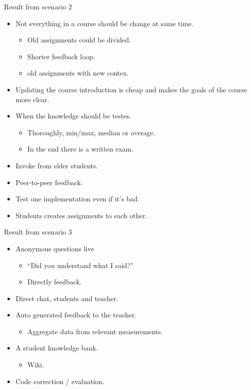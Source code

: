 \documentclass[a4paper,12pt]{article}
\begin{document}
Result from scenario 2
\begin{itemize}
\item Not everything in a course should be change at same time.
\begin{itemize}
\item Old assignments could be divided.
\item Shorter feedback loop.
\item old assignments with new contex.
\end{itemize}
\item Updating the course introduction is cheap and makes the goals of the course more clear.
\item When the knowledge should be testes.
\begin{itemize}
\item Thoroughly, min/max, median or average.
\item In the end there is a written exam.
\end{itemize}
\item Invoke from elder students.
\item Peer-to-peer feedback.
\item Test one implementation even if it's bad.
\item Students creates assignments to each other.
\end{itemize}

Result from scenario 3
\begin{itemize}
\item Anonymous questions live
\begin{itemize}
\item ``Did you understand what I said?''
\item Directly feedback.
\end{itemize}
\item Direct chat, students and teacher.
\item Auto generated feedback to the teacher.
\begin{itemize}
\item Aggregate data from relevant measurements.
\end{itemize}
\item A student knowledge bank.
\begin{itemize}
\item Wiki.
\end{itemize}
\item Code correction / evaluation.
\end{itemize}
\end{document}
